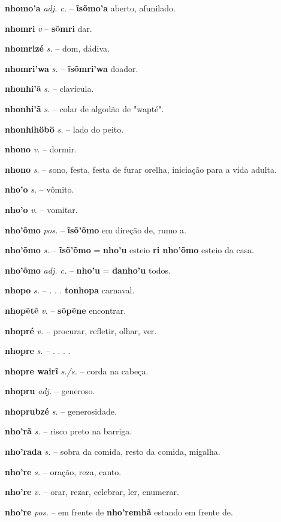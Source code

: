 \textbf{nhomo'a} \textit{adj. c.} -- \textbf{ĩsõmo'a} aberto, afunilado.

\textbf{nhomri} \textit{v} -- \textbf{sõmri} dar.

\textbf{nhomrizé} \textit{s.} -- dom, dádiva.

\textbf{nhomri'wa} \textit{s.} -- \textbf{ĩsõmri'wa} doador.

\textbf{nhonhi'ã} \textit{s.} -- clavícula.

\textbf{nhonhi'ã} \textit{s.} -- colar de algodão de "wapté".

\textbf{nhonhihöbö} \textit{s.} -- lado do peito.

\textbf{nhono} \textit{v.} -- dormir.

\textbf{nhono} \textit{s.} -- sono, festa, festa de furar orelha, iniciação para a vida adulta.

\textbf{nho'o} \textit{s.} -- vômito.

\textbf{nho'o} \textit{v.} -- vomitar.

\textbf{nho'õmo} \textit{pos.} -- \textbf{ĩsõ'õmo} em direção de, rumo a.

\textbf{nho'õmo} \textit{s.} -- \textbf{ĩsõ'õmo} = \textbf{nho'u} esteio  \textbf{ri nho'õmo} esteio da casa.

\textbf{nho'õmo} \textit{adj. c.} -- \textbf{nho'u} = \textbf{danho'u} todos.

\textbf{nhopo} \textit{s.} -- . . .  \textbf{tonhopa} carnaval.

\textbf{nhopẽtẽ} \textit{v.} -- \textbf{sõpẽne} encontrar.

\textbf{nhopré} \textit{v.} -- procurar, refletir, olhar, ver.

\textbf{nhopre} \textit{s.} -- . . . .

\textbf{nhopre wairĩ} \textit{s./s.} -- corda na cabeça.

\textbf{nhopru} \textit{adj.} -- generoso.

\textbf{nhoprubzé} \textit{s.} -- generosidade.

\textbf{nho'rã} \textit{s.} -- risco preto na barriga.

\textbf{nho'rada} \textit{s.} -- sobra da comida, resto da comida, migalha.

\textbf{nho're} \textit{s.} -- oração, reza, canto.

\textbf{nho're} \textit{v.} -- orar, rezar, celebrar, ler, enumerar.

\textbf{nho're} \textit{pos.} -- em frente de  \textbf{nho'remhã} estando em frente de.

